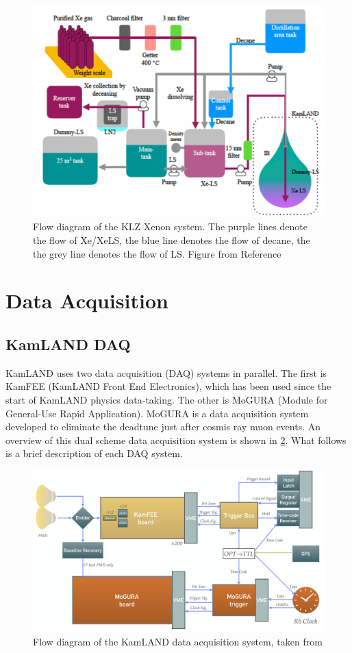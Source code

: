 \begin{figure}[htb]
	\centering
	\includegraphics[scale=0.5]{xenonhandling.png}
	\caption{Flow diagram of the KLZ Xenon system. The purple lines denote the flow of Xe/XeLS, the blue line denotes the flow of decane, the the grey line denotes the flow of LS. Figure from Reference }
	\label{fig:xenonhandling}
\end{figure}

\section{Data Acquisition}
\subsection{KamLAND DAQ}
KamLAND uses two data acquisition (DAQ) systems in parallel. The first is KamFEE (KamLAND Front End Electronics), which has been used since the start of KamLAND physics data-taking. The other is MoGURA (Module for General-Use Rapid Application). MoGURA is a data acquisition system developed to eliminate the deadtune just after cosmis ray muon events. An overview of this dual scheme data acquisition system is shown in \ref{fig:kamland_daq}. What follows is a brief description of each DAQ system.

\begin{figure}[htb]
	\centering
	\includegraphics[scale=0.3]{kamdaq_flow.png}
	\caption{Flow diagram of the KamLAND data acquisition system, taken from \cite{li_phd}}
	\label{fig:kamland_daq}
\end{figure}

